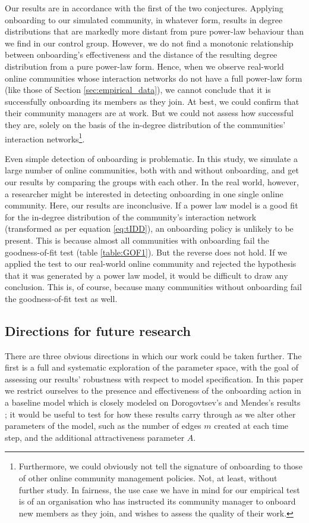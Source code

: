 \documentclass{bmcart}
\begin{document}
Our results are in accordance with the first of the two conjectures. Applying onboarding to our simulated community, in whatever form, results in degree distributions that are markedly more distant from pure power-law behaviour than we find in our control group. However, we do not find a monotonic relationship between onboarding's effectiveness and the distance of the resulting degree distribution from a pure power-law form. Hence, when we observe real-world online communities whose interaction networks do not have a full power-law form (like those of Section \ref{sec:empirical_data}), we cannot conclude that it is successfully onboarding its members as they join. At best, we could confirm that their community managers are at work. But we could not assess how successful they are, solely on the basis of the in-degree distribution of the communities' interaction networks\footnote{Furthermore, we could obviously not tell the signature of onboarding to those of other online community management policies. Not, at least, without further study. In fairness, the use case we have in mind for our empirical test is of an organisation who has instructed its community manager to onboard new members as they join, and wishes to assess the quality of their work.}. 

Even simple detection of onboarding is problematic. In this study, we simulate a large  number of online communities, both with and without onboarding, and get our results by comparing the groups with each other. In the real world, however, a researcher might be interested in detecting onboarding in one single online community. Here, our results are inconclusive. If a power law model is a good fit for the in-degree distribution of the community's interaction network (transformed as per equation \ref{eq:tIDD}), an onboarding policy is unlikely to be present. This is because almost all communities with onboarding fail the goodness-of-fit test (table \ref{table:GOF1}). But the reverse does not hold. If we applied the test to our real-world online community and rejected the hypothesis that it was generated by a power law model, it would be difficult to draw any conclusion. This is, of course, because many communities without onboarding fail the goodness-of-fit test as well. 

\subsection*{Directions for future research}

There are three obvious directions in which our work could be taken further. The first is a full and systematic exploration of the parameter space, with the goal of assessing our results' robustness with respect to model specification. In this paper we restrict ourselves to the presence and effectiveness of the onboarding action in a baseline model which is closely modeled on Dorogovtsev's and Mendes's results \cite{dorogovtsev2002evolution}; it would be useful to test for how these results carry through as we alter other parameters of the model, such as the number of edges $m$ created at each time step, and the additional attractiveness parameter $A$. 
\end{document}
